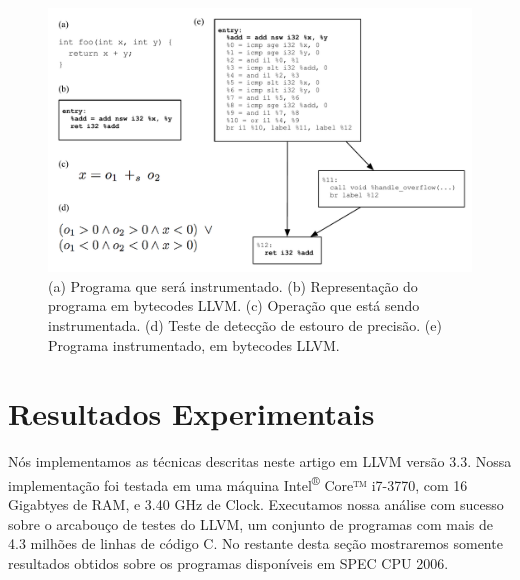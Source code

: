\documentclass{llncs}
\begin{document}
\begin{figure}[t!]
\begin{center}
\includegraphics[width=1\textwidth]{images/instrumented_cfg}
\caption{(a) Programa que será instrumentado.
(b) Representação do programa em bytecodes LLVM.
(c) Operação que está sendo instrumentada.
(d) Teste de detecção de estouro de precisão.
(e) Programa instrumentado, em bytecodes LLVM.}
\label{fig:instrumented_cfg}
\end{center}
\end{figure}


\section{Resultados Experimentais}
\label{sec:exp}

Nós implementamos as técnicas descritas neste artigo em LLVM versão 3.3.
Nossa implementação foi testada em uma máquina Intel\textsuperscript{®} Core™ i7-3770, com 16 Gigabtyes de
RAM, e 3.40 GHz de Clock.
Executamos nossa análise com sucesso sobre o arcabouço de testes do LLVM,
um conjunto de programas com mais de 4.3 milhões de linhas de código C.
No restante desta seção mostraremos somente resultados obtidos sobre os
programas disponíveis em SPEC CPU 2006.
\end{document}
